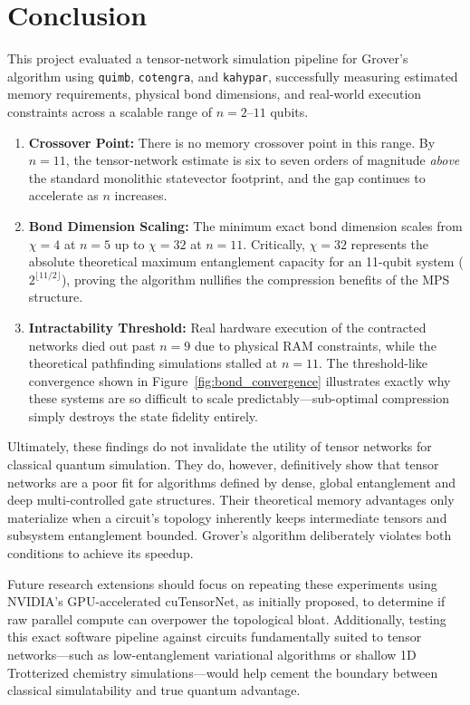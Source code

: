 \documentclass[sigconf, authorversion, nonacm]{acmart}
\begin{document}
\section{Conclusion}

This project evaluated a tensor-network simulation pipeline for Grover's algorithm using \texttt{quimb}, \texttt{cotengra}, and \texttt{kahypar}, successfully measuring estimated memory requirements, physical bond dimensions, and real-world execution constraints across a scalable range of $n=2$--$11$ qubits.

\begin{enumerate}
  \item \textbf{Crossover Point:} There is no memory crossover point in this range. By $n=11$, the tensor-network estimate is six to seven orders of magnitude \emph{above} the standard monolithic statevector footprint, and the gap continues to accelerate as $n$ increases.
  \item \textbf{Bond Dimension Scaling:} The minimum exact bond dimension scales from $\chi=4$ at $n=5$ up to $\chi=32$ at $n=11$. Critically, $\chi=32$ represents the absolute theoretical maximum entanglement capacity for an 11-qubit system ($2^{\lfloor 11/2 \rfloor}$), proving the algorithm nullifies the compression benefits of the MPS structure.
  \item \textbf{Intractability Threshold:} Real hardware execution of the contracted networks died out past $n=9$ due to physical RAM constraints, while the theoretical pathfinding simulations stalled at $n=11$. The threshold-like convergence shown in Figure~\ref{fig:bond_convergence} illustrates exactly why these systems are so difficult to scale predictably—sub-optimal compression simply destroys the state fidelity entirely.
\end{enumerate}

Ultimately, these findings do not invalidate the utility of tensor networks for classical quantum simulation. They do, however, definitively show that tensor networks are a poor fit for algorithms defined by dense, global entanglement and deep multi-controlled gate structures. Their theoretical memory advantages only materialize when a circuit's topology inherently keeps intermediate tensors and subsystem entanglement bounded. Grover's algorithm deliberately violates both conditions to achieve its speedup.

Future research extensions should focus on repeating these experiments using NVIDIA's GPU-accelerated cuTensorNet, as initially proposed, to determine if raw parallel compute can overpower the topological bloat. Additionally, testing this exact software pipeline against circuits fundamentally suited to tensor networks—such as low-entanglement variational algorithms or shallow 1D Trotterized chemistry simulations—would help cement the boundary between classical simulatability and true quantum advantage.
\end{document}
